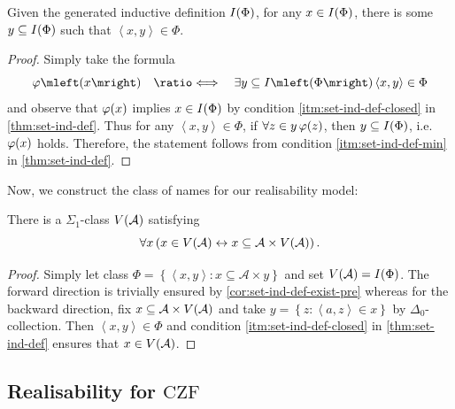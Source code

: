 \documentclass[12pt,openany]{book}
\theoremstyle{plain}
\theoremstyle{definition}
\newcommand\tuple[1]{\left\langle #1 \right\rangle}
\newcommand\opA[1]{\mathop{\forall #1}}
\newcommand\opE[1]{\mathop{\exists #1}}
\newcommand\defeqv{\quad \ratio\Longleftrightarrow \quad}
\newcommand\CZF{\mathrm{CZF}}
\newcommand\IKP{\mathrm{IKP}}
\begin{document}
\begin{corollary}[$\IKP$]
  \label{cor:set-ind-def-exist-pre}
  Given the generated inductive definition $I\mleft(\Phi\mright)$, for any $x \in I\mleft(\Phi\mright)$, there is some $y \subseteq I\mleft(\Phi\mright)$ such that $\tuple{x, y} \in \Phi$.
\end{corollary}

\begin{proof}
  Simply take the formula
  \[\varphi\mleft(x\mright) \defeqv \opE{y \subseteq I\mleft(\Phi\mright)} \tuple{x, y} \in \Phi\]
  and observe that $\varphi\mleft(x\mright)$ implies $x \in I\mleft(\Phi\mright)$ by condition \ref{itm:set-ind-def-closed} in \autoref{thm:set-ind-def}. Thus for any $\tuple{x, y} \in \Phi$, if $\opA{z \in y} \varphi\mleft(z\mright)$, then $y \subseteq I\mleft(\Phi\mright)$, i.e.\ $\varphi\mleft(x\mright)$ holds. Therefore, the statement follows from condition \ref{itm:set-ind-def-min} in \autoref{thm:set-ind-def}.
\end{proof}

Now, we construct the class of names for our realisability model:
\begin{corollary}[$\IKP$]
  \label{cor:czf-in-czf-name-def}
  There is a $\Sigma_1$-class $V\mleft(\mathcal{A}\mright)$ satisfying
  \[\opA{x} \left(x \in V\mleft(\mathcal{A}\mright) \leftrightarrow x \subseteq \mathcal{A} \times V\mleft(\mathcal{A}\mright)\right).\]
\end{corollary}

\begin{proof}
  Simply let class $\Phi = \left\{\tuple{x, y} : x \subseteq \mathcal{A} \times y\right\}$ and set $V\mleft(\mathcal{A}\mright) = I\mleft(\Phi\mright)$. The forward direction is trivially ensured by \autoref{cor:set-ind-def-exist-pre} whereas for the backward direction, fix $x \subseteq \mathcal{A} \times V\mleft(\mathcal{A}\mright)$ and take $y = \left\{z : \tuple{a, z} \in x\right\}$ by $\Delta_0$-collection. Then $\tuple{x, y} \in \Phi$ and condition \ref{itm:set-ind-def-closed} in \autoref{thm:set-ind-def} ensures that $x \in V\mleft(\mathcal{A}\mright)$.
\end{proof}

\subsection*{Realisability for $\CZF$}
\end{document}
